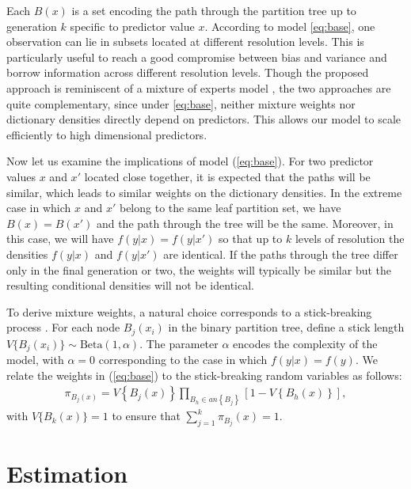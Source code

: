 \documentclass{article}
\begin{document}
Each $B(x)$ is a set encoding the path through the partition tree up to generation $k$ specific to predictor value $x$. According to model \eqref{eq:base}, one observation can lie in subsets located at different resolution levels. This is particularly useful to reach a good compromise between bias and variance and borrow information across different resolution levels. Though the proposed approach is reminiscent of a mixture of experts model \cite{mixtureexperts}, the two approaches are quite complementary, since under \eqref{eq:base}, neither mixture weights nor dictionary densities directly depend on predictors. This allows our model to scale efficiently to high dimensional predictors.

Now let us examine the implications of model (\ref{eq:base}). For two predictor values $x$ and $x'$ located close together, it is expected that the paths will be similar, which leads to similar weights on the dictionary densities.  In the extreme case in which $x$ and $x'$ belong to the same leaf partition set, we have $B(x) = B(x')$ and the path through the tree will be the same.  Moreover, in this case, we will have $f(y|x)=f(y|x')$ so that up to $k$ levels of resolution the densities $f(y|x)$ and $f(y|x')$ are identical.  If the paths through the tree differ only in the final generation or two, the weights will typically be similar but the resulting conditional densities will not be identical. 

To derive mixture weights, a natural choice corresponds to a stick-breaking process \cite{stickbreaking}.  For each node $B_j(x_i)$ in the binary partition tree, define a stick length $V\{B_j(x_i)\} \sim \mbox{Beta}(1,\alpha)$.  The parameter $\alpha$ encodes the complexity of the model, with $\alpha=0$ corresponding to the case in which $f(y|x) = f(y)$.  We relate the weights in (\ref{eq:base}) to the stick-breaking random variables as follows: 
\begin{eqnarray*}
\pi_{B_j(x)} = V\left\{B_j(x)\right\} \prod_{B_h \in an\left\{B_j\right\}} \left[1 - V\left\{B_h(x)\right\}\right],
\end{eqnarray*}
with $V\{B_k(x)\}=1$ to ensure that $\sum_{j=1}^k \pi_{B_j}(x) = 1$.    
\vskip 12pt


\section{Estimation}
\end{document}
